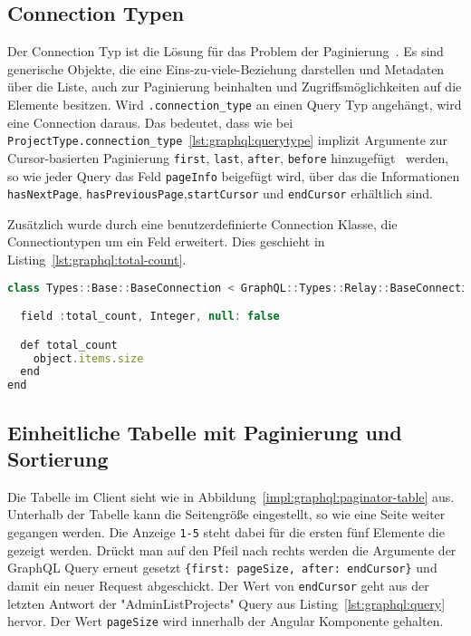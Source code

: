 \subsection{Connection Typen}
\label{graphql:connections}
Der Connection Typ ist die Lösung für das Problem der Paginierung~\cite{graphql-connection-concept}.
Es sind generische Objekte, die eine Eins-zu-viele-Beziehung darstellen und Metadaten über die Liste, auch zur Paginierung beinhalten und Zugriffsmöglichkeiten auf die Elemente besitzen.
Wird \lstinline|.connection_type| an einen Query Typ angehängt, wird eine Connection daraus. 
Das bedeutet, dass wie bei \lstinline|ProjectType.connection_type|~\ref{lst:graphql:querytype} implizit Argumente zur Cursor-basierten Paginierung \lstinline|first|, \lstinline|last|, \lstinline|after|, \lstinline|before| hinzugefügt~\cite{graphql-relay-connection} werden, so wie jeder Query das Feld \lstinline|pageInfo| beigefügt wird, über das die Informationen \lstinline|hasNextPage|, \lstinline|hasPreviousPage|,\lstinline|startCursor| und \lstinline|endCursor| erhältlich sind. 

Zusätzlich wurde durch eine benutzerdefinierte Connection Klasse, die Connectiontypen um ein Feld erweitert.
Dies geschieht in Listing~\ref{lst:graphql:total-count}.

\begin{lstlisting}[language=JavaScript,float=h!,caption={Benutzerdefinierte Connection Klasse mit hinzugefügtem Feld}, label={lst:graphql:total-count}]
class Types::Base::BaseConnection < GraphQL::Types::Relay::BaseConnection

  field :total_count, Integer, null: false

  def total_count
    object.items.size
  end
end
\end{lstlisting}

\subsection{Einheitliche Tabelle mit Paginierung und Sortierung}
\label{impl:paginator-component}
Die Tabelle im Client sieht wie in Abbildung~\ref{impl:graphql:paginator-table} aus. Unterhalb der Tabelle kann die Seitengröße eingestellt, so wie eine Seite weiter gegangen werden. Die Anzeige \lstinline|1-5| steht dabei für die ersten fünf Elemente die gezeigt werden. Drückt man auf den Pfeil nach rechts werden die Argumente der GraphQL Query erneut gesetzt \lstinline|{first: pageSize, after: endCursor}| und damit ein neuer Request abgeschickt.
Der Wert von \lstinline|endCursor| geht aus der letzten Antwort der "AdminListProjects" Query aus Listing~\ref{lst:graphql:query} hervor. Der Wert \lstinline|pageSize| wird innerhalb der Angular Komponente gehalten. 

